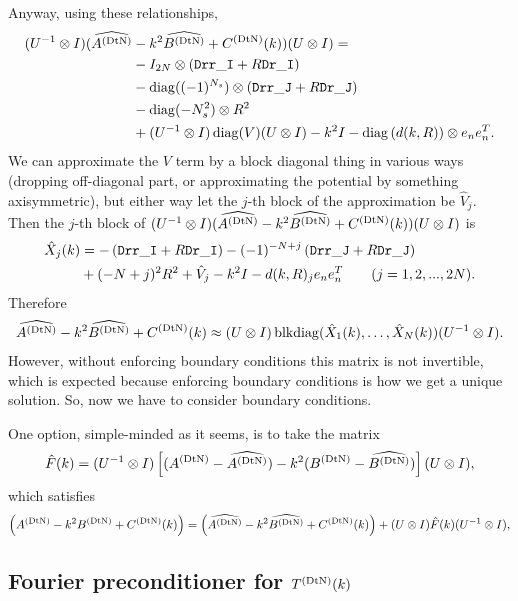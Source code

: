 Anyway, using these relationships,
\begin{align*}
(U^{-1} \otimes I)
(\widehat{A^{(\text{DtN})}} &- k^2 \widehat{B^{(\text{DtN})}} + C^{(\text{DtN})}(k))
(U \otimes I) = \\ 
 &-I_{2N} \otimes \left({\tt Drr\_I} + R {\tt Dr\_I} \right) \\
 &-\operatorname{diag}( (-1)^{N_s} )
          \otimes \left({\tt Drr\_J} + R {\tt Dr\_J} \right) \\
 &-\operatorname{diag}( -N_s^2 )     \otimes R^2 \\
 &+ (U^{-1} \otimes I)\operatorname{diag}(V)(U \otimes I)
  - k^2 I - \operatorname{diag}\left(d(k,R)\right) \otimes e_n e_n^T.
\end{align*}
We can approximate the $V$ term by a block diagonal thing in various ways
(dropping off-diagonal part, or approximating the potential by
something axisymmetric), but either way let the $j$-th block of
the approximation be $\hat{V}_j$. Then the $j$-th block  of
$(U^{-1} \otimes I)
(\widehat{A^{(\text{DtN})}} - k^2 \widehat{B^{(\text{DtN})}} + C^{(\text{DtN})}(k))(U \otimes I)$ is
\begin{align*}
 \hat{X}_j(k) &=
 -                  \left({\tt Drr\_I} + R {\tt Dr\_I}\right)
 -(-1)^{-N + j} \left({\tt Drr\_J} + R {\tt Dr\_J}\right) \\ 
 &+(-N + j)^2 R^2 + \hat{V}_j - k^2 I - d(k,R)_j e_n e_n^T
\qquad
(j = 1,2,...,2N).
\end{align*}
Therefore
\begin{align*}
 \widehat{A^{(\text{DtN})}} - k^2 \widehat{B^{(\text{DtN})}} + C^{(\text{DtN})}(k) \approx
 (U \otimes I)\operatorname{blkdiag}(\hat{X}_1(k), \hdots , \hat{X}_N(k))
 (U^{-1} \otimes I).
\end{align*}
However, without enforcing boundary conditions this matrix is not invertible,
which is expected because enforcing boundary conditions is how we get
a unique solution. So, now we have to consider boundary conditions.

One option, simple-minded as it seems, is to take the matrix
\begin{align*}
 \hat{F}(k) 
 = 
 (U^{-1} \otimes I)
 \left[(A^{(\text{DtN})} - \widehat{A^{(\text{DtN})}}) - k^2(B^{(\text{DtN})} - \widehat{B^{(\text{DtN})}})\right]
 (U      \otimes I),
\end{align*}
which satisfies
\begin{align*}
 \left(A^{(\text{DtN})} - k^2 B^{(\text{DtN})} + C^{(\text{DtN})}(k)\right)
 = 
 \left(\widehat{A^{(\text{DtN})}} - k^2 \widehat{B^{(\text{DtN})}} + C^{(\text{DtN})}(k)\right)
 + (U \otimes I)\hat{F}(k)(U^{-1} \otimes I),
\end{align*}

\subsection{Fourier preconditioner for $T^{(\text{DtN})}(k)$}

